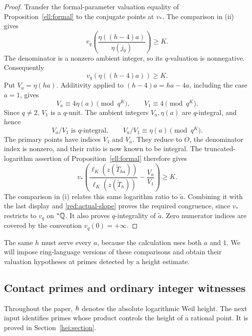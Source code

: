 \begin{proof}
Transfer the formal-parameter valuation equality of
Proposition~\ref{ell:formal} to the conjugate points at \(v_*\).
The comparison in (ii) gives
\[
 v_q\!\left(\frac{\eta((h-4)a)}{\eta(j_0)}\right)\ge K.
\]
The denominator is a nonzero ambient integer, so its \(q\)-valuation
is nonnegative. Consequently
\begin{equation}\label{red:alternate-index}
                         v_q(\eta((h-4)a))\ge K.
\end{equation}
Put \(V_a=\eta(ha)\). Additivity applied to
\((h-4)a=ha-4a\), including the case \(a=1\), gives
\[
              V_a\equiv4\eta(a)\pmod{q^K},\qquad
              V_1\equiv4\pmod{q^K}.
\]
Since \(q\ne2\), \(V_1\) is a \(q\)-unit. The ambient integers
\(V_a,\eta(a)\) are \(q\)-integral, and hence
\begin{equation}\label{red:actual-slope}
       V_a/V_1\text{ is \(q\)-integral},\qquad
       V_a/V_1\equiv\eta(a)\pmod{q^K}.
\end{equation}
The primary points have indices \(V_1\) and \(V_a\). They reduce to
\(O\), the denominator index is nonzero, and their ratio is now known
to be integral. The truncated-logarithm assertion of
Proposition~\ref{ell:formal} therefore gives
\[
 v_*\!\left(
 \frac{\ell_K(z(\widetilde T_{ha}))}{\ell_K(z(\widetilde T_h))}
                         -\frac{V_a}{V_1}\right)\ge K.
\]
The comparison in (i) relates this same logarithm ratio to
\(\widetilde a\). Combining it with the last display and
\eqref{red:actual-slope} proves the required congruence, since
\(v_*\) restricts to \(v_q\) on \({}^*\mathbb Q\). It also proves
\(q\)-integrality of \(\widetilde a\). Zero numerator indices are
covered by the convention \(v_q(0)=+\infty\).

\end{proof}

The same \(h\) must serve every \(a\), because the calculation uses
both \(a\) and \(1\).  We will impose ring-language versions of these
comparisons and obtain their valuation hypotheses at primes detected by a
height estimate.

\subsection{Contact primes and ordinary integer witnesses}
\label{red:arithmetic-inputs}

Throughout the paper, \(h\) denotes the absolute logarithmic Weil
height.  The next input identifies primes whose product controls the height
of a rational point.  It is proved in Section~\ref{hei:section}.

